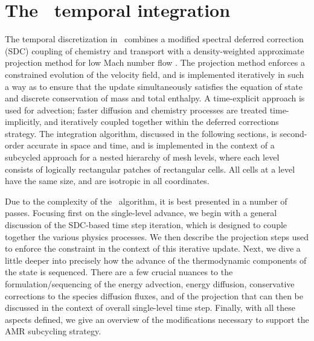 \section{The \pelelm\ temporal integration}
The temporal discretization in \pelelm\ combines a modified spectral deferred correction (SDC) coupling of chemistry and transport \cite{LMC_SDC} with a density-weighted approximate projection method for low Mach number flow \cite{DayBell:2000}.  The projection method enforces a constrained evolution of the velocity field, and is implemented iteratively in such a way as to ensure that the update simultaneously satisfies the  equation of state and discrete conservation of mass and total enthalpy.  A time-explicit approach is used for advection; faster diffusion and chemistry processes are treated time-implicitly, and iteratively coupled together within the deferred corrections strategy. The integration algorithm, discussed in the following sections, is second-order accurate in space and time, and is implemented in the context of a subcycled approach for a nested hierarchy of mesh levels, where each level consists of logically rectangular patches of rectangular cells.  All cells at a level have the same size, and are isotropic in all coordinates.

Due to the complexity of the \pelelm\ algorithm, it is best presented in a number of passes.  Focusing first on the single-level advance, we begin with a general discussion of the SDC-based time step iteration, which is designed to couple together the various physics processes.  We then describe the projection steps used to enforce the constraint in the context of this iterative update.  Next, we dive a little deeper into precisely how the advance of the thermodynamic components of the state is sequenced.  There are a few crucial nuances to the formulation/sequencing of the energy advection, energy diffusion, conservative corrections to the species diffusion fluxes, and of the projection that can then be discussed in the context of overall single-level time step.  Finally, with all these aspects defined, we give an overview of the modifications necessary to support the AMR subcycling strategy.

